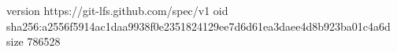 version https://git-lfs.github.com/spec/v1
oid sha256:a2556f5914ac1daa9938f0e2351824129ee7d6d61ea3daee4d8b923ba01c4a6d
size 786528
